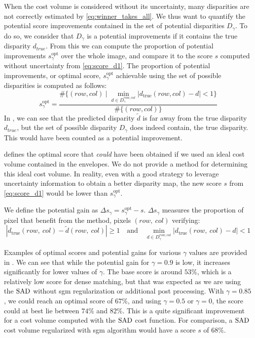 When the cost volume is considered without its uncertainty, many disparities are not correctly estimated by \cref{eq:winner_takes_all}. We thus want to quantify the potential score improvements contained in the set of potential disparities $D_\gamma$. To do so, we consider that $D_\gamma$ is a potential improvements if it contains the true disparity $d_{true}$. From this we can compute the proportion of potential improvements $s_\gamma^{\text{opt}}$ over the whole image, and compare it to the score $s$ computed without uncertainty from \cref{eq:score_d1}. The proportion of potential improvements, or optimal score, \( s_\gamma^{\text{opt}} \) achievable using the set of possible disparities is computed as follows:
\begin{equation}\label{eq:optimal_score}
    s_\gamma^{\text{opt}} = \frac{\#\{(row, col) \mid \min_{d \in D_\gamma^{row, col}} |d_{\mathrm{true}}(row, col) - d| < 1\}}{\#\{(row, col)\}}
\end{equation}
In , we can see that the predicted disparity $\tilde{d}$ is far away from the true disparity $d_{true}$, but the set of possible disparity $D_\gamma$ does indeed contain, the true disparity. This would have been counted as a potential improvement.

\begin{remark}
     defines the optimal score that \textit{could} have been obtained if we used an ideal cost volume contained in the envelopes. We do not provide a method for determining this ideal cost volume. In reality, even with a good strategy to leverage uncertainty information to obtain a better disparity map, the new score $s$ from \cref{eq:score_d1} would be lower than $s_\gamma^{\text{opt}}$.
\end{remark}

We define the potential gain as \( \Delta s_\gamma = s_\gamma^{\text{opt}} - s \). $\Delta s_\gamma$ measures the proportion of pixel that benefit from the method, \ie pixels $(row, ~col)$ verifying:
\begin{equation}
    |d_{\mathrm{true}}(row, ~col) - \tilde{d}(row, ~col)| \geq 1 \quad \text{and} \quad \min_{d \in D_\gamma^{row, col}} |d_{\mathrm{true}}(row, ~col) - d| < 1
\end{equation}

Examples of optimal scores and potential gains for various $\gamma$ values are provided in . We can see that while the potential gain for $\gamma = 0.9$ is low, it increases significantly for lower values of $\gamma$. The base score is around $53\%$, which is a relatively low score for dense matching, but that was expected as we are using the $\mathrm{SAD}$ without \acrshort{sgm} regularization or additional post processing. With $\gamma=0.85$, we could reach an optimal score of $67\%$, and using $\gamma=0.5$ or $\gamma=0$, the score could at best lie between $74\%$ and $82\%$. This is a quite significant improvement for a cost volume computed with the $\mathrm{SAD}$ cost function. For comparison, a $\mathrm{SAD}$ cost volume regularized with \acrshort{sgm} algorithm would have a score $s$ of $68\%$.

